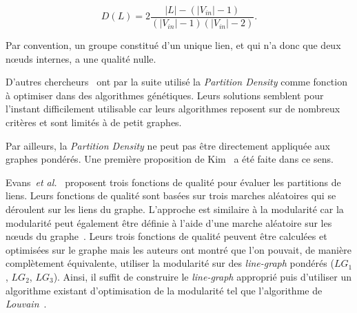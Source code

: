 \begin{equation}
 D(L) = 2 \dfrac{|L| - (|V_{in}|-1) }{(|V_{in}|-1) (|V_{in}|-2)}.
\end{equation}

Par convention, un groupe constitué d'un unique lien, et qui n'a donc que deux n\oe uds internes, a une qualité nulle.

D'autres chercheurs~\cite{Li2013,Shi2013} ont par la suite utilisé la \emph{Partition Density} comme fonction à optimiser dans des algorithmes génétiques.
Leurs solutions semblent pour l'instant difficilement utilisable car leurs algorithmes reposent sur de nombreux critères et sont limités à de petit graphes.

Par ailleurs, la \emph{Partition Density} ne peut pas être directement appliquée aux graphes pondérés.
Une première proposition de Kim~\cite{Kim2014a} a été faite dans ce sens.




Evans~\emph{et al.}~\cite{Evans2009} proposent trois fonctions de qualité pour évaluer les partitions de liens.
Leurs fonctions de qualité sont basées sur trois marches aléatoires qui se déroulent sur les liens du graphe.
L'approche est similaire à la modularité car la modularité peut également être définie à l'aide d'une marche aléatoire sur les n\oe uds du graphe~\cite{Delvenne2010}.
Leurs trois fonctions de qualité peuvent être calculées et optimisées sur le graphe mais les auteurs ont montré que l'on pouvait, de manière complètement équivalente, utiliser la modularité sur des \emph{line-graph} pondérés ($LG_1$, $LG_2$, $LG_3$).
Ainsi, il suffit de construire le \emph{line-graph} approprié puis d'utiliser un algorithme existant d'optimisation de la modularité tel que l'algorithme de \emph{Louvain}~\cite{Blondel2008a}.



